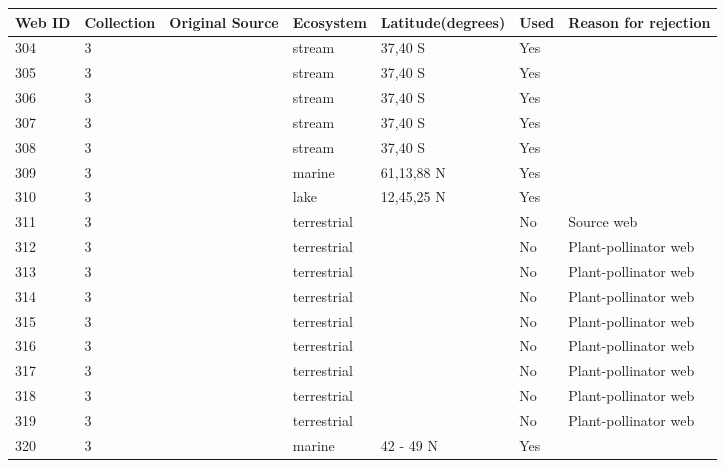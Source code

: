 \documentclass[12pt]{article}
\begin{document}
\begin{landscape}
    \begin{table}[h!]
    \centering
    {\footnotesize
      \begin{tabular}{p{2.8cm}p{1.3cm}p{5.5cm}p{2.2cm}p{2.5cm}lp{3.5cm}}
        \hline
        Web ID & Collection & Original Source & Ecosystem & Latitude(degrees) & Used  & Reason for rejection  \\
        \hline
        304   & 3 & \citet{Closs1994}  & stream & 37,40 S & Yes   &       \\
        305   & 3 & \citet{Closs1994}  & stream & 37,40 S & Yes   &       \\
        306   & 3 & \citet{Closs1994}  & stream & 37,40 S & Yes   &       \\
        307   & 3 & \citet{Closs1994}  & stream & 37,40 S & Yes   &       \\
        308   & 3 & \citet{Closs1994}  & stream & 37,40 S & Yes   &       \\
        309   & 3 & \citet{Gontikaki2011}  & marine & 61,13,88 N & Yes   &       \\
        310   & 3 & \citet{Khan2009}  & lake  & 12,45,25 N & Yes   &       \\
        311   & 3 & \citet{Memmott2000}     & terrestrial &       & No    & Source web \\
        312   & 3 & \citet{Kaiser-Bunbury2009}  & terrestrial &       & No    & Plant-pollinator web \\
        313   & 3 & \citet{Kaiser-Bunbury2009}  & terrestrial &       & No    & Plant-pollinator web \\
        314   & 3 & \citet{Kaiser-Bunbury2011}  & terrestrial &       & No    & Plant-pollinator web \\
        315   & 3 & \citet{Kaiser-Bunbury2011}  & terrestrial &       & No    & Plant-pollinator web \\
        316   & 3 & \citet{Kaiser-Bunbury2011}  & terrestrial &       & No    & Plant-pollinator web \\
        317   & 3 & \citet{Kaiser-Bunbury2011}  & terrestrial &       & No    & Plant-pollinator web \\
        318   & 3 & \citet{Kaiser-Bunbury2011}  & terrestrial &       & No    & Plant-pollinator web \\
        319   & 3 & \citet{Kaiser-Bunbury2011}  & terrestrial &       & No    & Plant-pollinator web \\
        320   & 3 & \citet{Ruzicka2012}    & marine & 42 - 49 N & Yes   &       \\

\end{tabular}}
\end{table}
\end{landscape}
\end{document}
